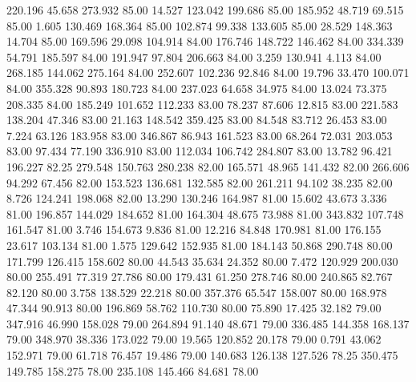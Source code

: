  220.196   45.658  273.932        85.00
  14.527  123.042  199.686        85.00
 185.952   48.719   69.515        85.00
   1.605  130.469  168.364        85.00
 102.874   99.338  133.605        85.00
  28.529  148.363   14.704        85.00
 169.596   29.098  104.914        84.00
 176.746  148.722  146.462        84.00
 334.339   54.791  185.597        84.00
 191.947   97.804  206.663        84.00
   3.259  130.941    4.113        84.00
 268.185  144.062  275.164        84.00
 252.607  102.236   92.846        84.00
  19.796   33.470  100.071        84.00
 355.328   90.893  180.723        84.00
 237.023   64.658   34.975        84.00
  13.024   73.375  208.335        84.00
 185.249  101.652  112.233        83.00
  78.237   87.606   12.815        83.00
 221.583  138.204   47.346        83.00
  21.163  148.542  359.425        83.00
  84.548   83.712   26.453        83.00
   7.224   63.126  183.958        83.00
 346.867   86.943  161.523        83.00
  68.264   72.031  203.053        83.00
  97.434   77.190  336.910        83.00
 112.034  106.742  284.807        83.00
  13.782   96.421  196.227        82.25
 279.548  150.763  280.238        82.00
 165.571   48.965  141.432        82.00
 266.606   94.292   67.456        82.00
 153.523  136.681  132.585        82.00
 261.211   94.102   38.235        82.00
   8.726  124.241  198.068        82.00
  13.290  130.246  164.987        81.00
  15.602   43.673    3.336        81.00
 196.857  144.029  184.652        81.00
 164.304   48.675   73.988        81.00
 343.832  107.748  161.547        81.00
   3.746  154.673    9.836        81.00
  12.216   84.848  170.981        81.00
 176.155   23.617  103.134        81.00
   1.575  129.642  152.935        81.00
 184.143   50.868  290.748        80.00
 171.799  126.415  158.602        80.00
  44.543   35.634   24.352        80.00
   7.472  120.929  200.030        80.00
 255.491   77.319   27.786        80.00
 179.431   61.250  278.746        80.00
 240.865   82.767   82.120        80.00
   3.758  138.529   22.218        80.00
 357.376   65.547  158.007        80.00
 168.978   47.344   90.913        80.00
 196.869   58.762  110.730        80.00
  75.890   17.425   32.182        79.00
 347.916   46.990  158.028        79.00
 264.894   91.140   48.671        79.00
 336.485  144.358  168.137        79.00
 348.970   38.336  173.022        79.00
  19.565  120.852   20.178        79.00
   0.791   43.062  152.971        79.00
  61.718   76.457   19.486        79.00
 140.683  126.138  127.526        78.25
 350.475  149.785  158.275        78.00
 235.108  145.466   84.681        78.00
